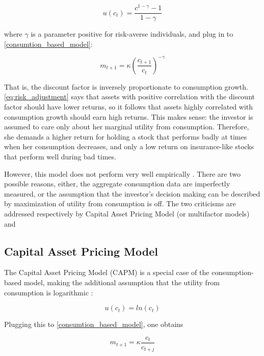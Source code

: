 		 	\begin{equation}
		 		u(c_t) = \frac{c^{1-\gamma}-1}{1-\gamma}
		 	\end{equation}
		 	
		 	where $\gamma$ is a parameter positive for risk-averse individuals, and plug in to \ref{consumtion_based_model}: 
		 	
		 	\begin{equation}
		 	m_{t+1} = \kappa \left(\frac{c_{t+1}}{c_t}\right)^{-\gamma} 
		 	\end{equation}
		 	
		 	That is, the discount factor is inversely proportionate to consumption growth. \ref{eq:risk_adjustment} says that assets with positive correlation with the discount factor should have lower returns, so it follows that assets highly correlated with consumption growth should earn high returns. This makes sense: the investor is assumed to care only about her marginal utility from consumption. Therefore, she demands a higher return for holding a stock that performs badly at times when her consumption decreases, and only a low return on insurance-like stocks that perform well during bad times.
		 	 
		 	However, this model does not perform very well empirically \cite{cochrane1996cross}. There are two possible reasons, either, the aggregate consumption data are imperfectly measured, or the assumption that the investor's decision making can be described by maximization of utility from consumption is off. The two criticisms are addressed respectively by Capital Asset Pricing Model (or multifactor models) and  
	 	
	 	\subsection{Capital Asset Pricing Model}
	 	
	 		The Capital Asset Pricing Model (CAPM) is a special case of the consumption-based model, making the additional assumption that the utility from consumption is logarithmic \citep{rubinstein1976valuation}:
	 		
	 		\begin{equation}
	 			u(c_t) = ln(c_t)
	 		\end{equation}
	 		
	 		Plugging this to \ref{consumtion_based_model}, one obtains 
	 		
	 		\begin{equation}
	 			m_{t+1} = \kappa \frac{c_t}{c_{t+j}}
	 		\end{equation}
	 		
